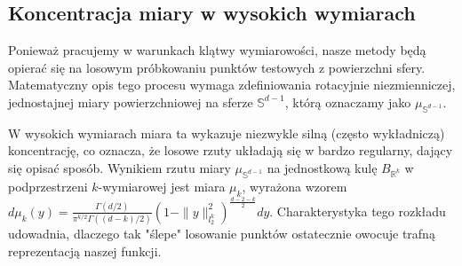 \subsection{Koncentracja miary w wysokich wymiarach}
Ponieważ pracujemy w warunkach klątwy wymiarowości, nasze metody będą opierać się na losowym próbkowaniu punktów testowych z powierzchni sfery. Matematyczny opis tego procesu wymaga zdefiniowania rotacyjnie niezmienniczej, jednostajnej miary powierzchniowej na sferze $\mathbb{S}^{d-1}$, którą oznaczamy jako $\mu_{\mathbb{S}^{d-1}}$.

W wysokich wymiarach miara ta wykazuje niezwykle silną (często wykładniczą) koncentrację, co oznacza, że losowe rzuty układają się w bardzo regularny, dający się opisać sposób. Wynikiem rzutu miary $\mu_{\mathbb{S}^{d-1}}$ na jednostkową kulę $B_{\mathbb{R}^k}$ w podprzestrzeni $k$-wymiarowej jest miara $\mu_k$, wyrażona wzorem $d\mu_k(y) = \frac{\Gamma(d/2)}{\pi^{k/2}\Gamma((d-k)/2)}(1 - \|y\|_{l_2^k}^2)^{\frac{d-2-k}{2}}dy$. Charakterystyka tego rozkładu udowadnia, dlaczego tak "ślepe" losowanie punktów ostatecznie owocuje trafną reprezentacją naszej funkcji.